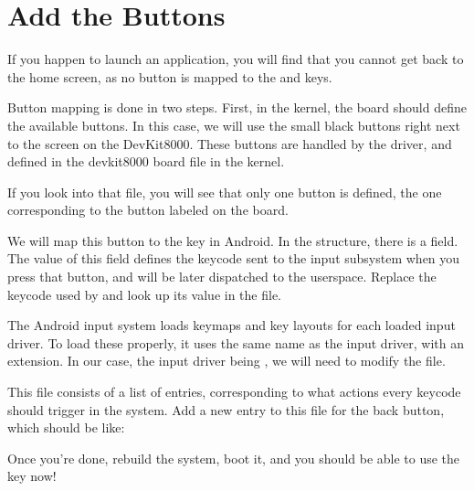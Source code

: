 \section{Add the Buttons}

If you happen to launch an application, you will find that you cannot
get back to the home screen, as no button is mapped to the  and 
keys.

Button mapping is done in two steps. First, in the kernel, the
board should define the available buttons. In this case, we will use
the small black buttons right next to the screen on the
DevKit8000. These buttons are handled by the  driver,
and defined in the devkit8000 board file in the kernel.

If you look into that file, you will see that only one button is
defined, the one corresponding to the button labeled 
on the board.

We will map this button to the  key in Android. In the
 structure, there is a  field. The
value of this field defines the keycode sent to the input
subsystem when you press that button, and will be later dispatched to
the userspace. Replace the keycode used by  and look up
its value in the  file.

The Android input system loads keymaps and key layouts for each loaded input
driver. To load these properly, it uses the same name as the
input driver, with an extension. In our case, the input driver being
, we will need to modify the  file.

This file consists of a list of entries, corresponding to what actions
every keycode should trigger in the system. Add a new entry to this file
for the back button, which should be like:

Once you're done, rebuild the system, boot it, and you should be able
to use the  key now!
